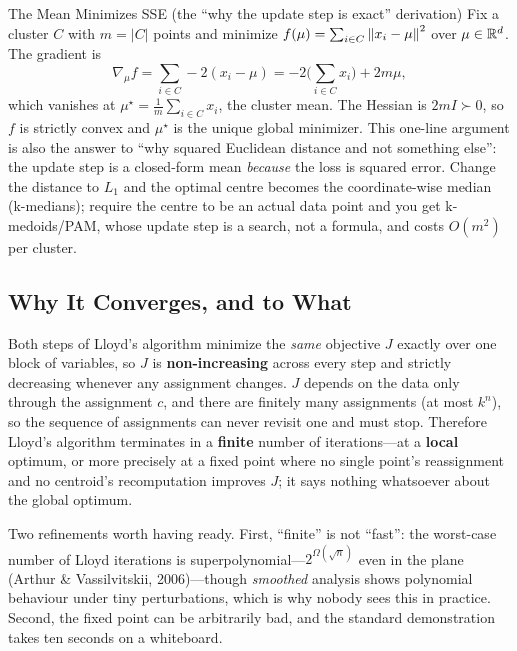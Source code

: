 \begin{mathresult}{The Mean Minimizes SSE (the ``why the update step is exact'' derivation)}
Fix a cluster $C$ with $m = |C|$ points and minimize $f(\mu) = \sum_{i \in C} \left\lVert x_i - \mu\right\rVert^2$ over $\mu \in \mathbb{R}^d$. The gradient is
\begin{equation}
\nabla_\mu f = \sum_{i \in C} -2(x_i - \mu) = -2\Big(\sum_{i \in C} x_i\Big) + 2m\mu,
\end{equation}
which vanishes at $\mu^\star = \frac{1}{m}\sum_{i \in C} x_i$, the cluster mean. The Hessian is $2m I \succ 0$, so $f$ is strictly convex and $\mu^\star$ is the unique global minimizer. This one-line argument is also the answer to ``why squared Euclidean distance and not something else'': the update step is a closed-form mean \emph{because} the loss is squared error. Change the distance to $L_1$ and the optimal centre becomes the coordinate-wise median (k-medians); require the centre to be an actual data point and you get k-medoids/PAM, whose update step is a search, not a formula, and costs $O(m^2)$ per cluster.
\end{mathresult}

\subsection{Why It Converges, and to What}

\begin{keyinsight}
Both steps of Lloyd's algorithm minimize the \emph{same} objective $J$ exactly over one block of variables, so $J$ is \textbf{non-increasing} across every step and strictly decreasing whenever any assignment changes. $J$ depends on the data only through the assignment $c$, and there are finitely many assignments (at most $k^n$), so the sequence of assignments can never revisit one and must stop. Therefore Lloyd's algorithm terminates in a \textbf{finite} number of iterations---at a \textbf{local} optimum, or more precisely at a fixed point where no single point's reassignment and no centroid's recomputation improves $J$; it says nothing whatsoever about the global optimum.
\end{keyinsight}

Two refinements worth having ready. First, ``finite'' is not ``fast'': the worst-case number of Lloyd iterations is superpolynomial---$2^{\Omega(\sqrt{n})}$ even in the plane (Arthur \& Vassilvitskii, 2006)---though \emph{smoothed} analysis shows polynomial behaviour under tiny perturbations, which is why nobody sees this in practice. Second, the fixed point can be arbitrarily bad, and the standard demonstration takes ten seconds on a whiteboard.

